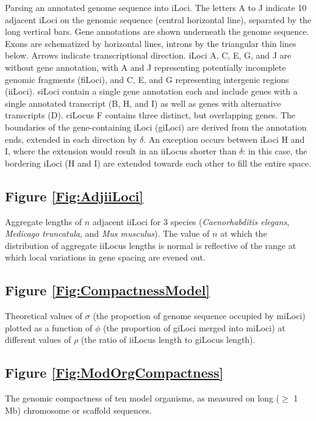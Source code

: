 \noindent
Parsing an annotated genome sequence into iLoci.
The letters A to J indicate 10 adjacent iLoci on the genomic sequence (central horizontal line), separated by the long vertical bars.
Gene annotations are shown underneath the genome sequence.
Exons are schematized by horizontal lines, introns by the triangular thin lines below.
Arrows indicate transcriptional direction.
iLoci A, C, E, G, and J are without gene annotation, with A and J representing potentially incomplete genomic fragments (fiLoci), and C, E, and G representing intergenic regions (iiLoci).
siLoci contain a single gene annotation each and include genes with a single annotated transcript (B, H, and I) as well as genes with alternative transcripts (D).
ciLocus F contains three distinct, but overlapping genes.
The boundaries of the gene-containing iLoci (giLoci) are derived from the annotation ends, extended in each direction by $\delta$.
An exception occurs between iLoci H and I, where the extension would result in an iiLocus shorter than $\delta$: in this case, the bordering iLoci (H and I) are extended towards each other to fill the entire space.

\subsection*{Figure \ref{Fig:AdjiiLoci}}

\noindent
Aggregate lengths of $n$ adjacent iiLoci for 3 species (\textit{Caenorhabditis elegans}, \textit{Medicago truncatula}, and \textit{Mus musculus}). The value of $n$ at which the distribution of aggregate iiLocus lengths is normal is reflective of the range at which local variations in gene spacing are evened out.

\subsection*{Figure \ref{Fig:CompactnessModel}}

\noindent
Theoretical values of $\sigma$ (the proportion of genome sequence occupied by miLoci) plotted as a function of $\phi$ (the proportion of giLoci merged into miLoci) at different values of $\rho$ (the ratio of iiLocus length to giLocus length).

\subsection*{Figure \ref{Fig:ModOrgCompactness}}

\noindent
The genomic compactness of ten model organisms, as measured on long ($\geq$ 1 Mb) chromosome or scaffold sequences.


